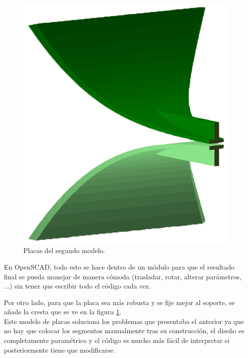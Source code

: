 \documentclass[11pt,a4paper,twoside,pdf]{article}
\numberwithin{equation}{section}
\begin{document}
\begin{figure}
    \vspace{-0.45cm}
    \includegraphics[width=\linewidth]{img/modelos/2025_02_21-ExtrudeFunctYSuavizado/cresta.png}
    \vspace{-0.66cm}
    \caption{Placas del segundo modelo.}\label{fig:cresta}
\end{figure}
En OpenSCAD, todo esto se hace dentro de un módulo para que el resultado final se pueda manejar de manera cómoda (trasladar, rotar, alterar parámetros, ...) sin tener que escribir todo el código cada vez.

Por otro lado, para que la placa sea más robusta y se fije mejor al soporte, se añade la cresta que se ve en la figura \ref{fig:cresta}.\\

Este modelo de placas soluciona los problemas que presentaba el anterior ya que no hay que colocar los segmentos manualmente tras su construcción, el diseño es completamente paramétrico y el código es mucho más fácil de interpretar si posteriormente tiene que modificarse.


\end{document}
